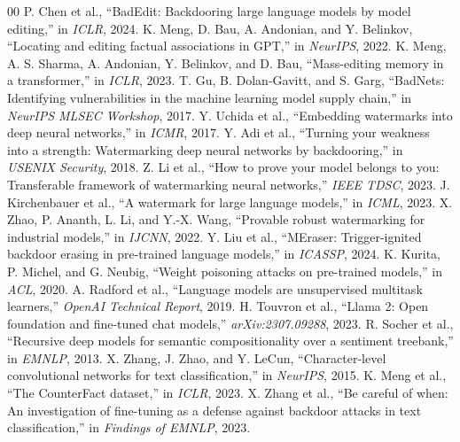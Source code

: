 \documentclass[conference,10pt]{IEEEtran}
\begin{document}
\begin{thebibliography}{00}
 P. Chen et al., ``BadEdit: Backdooring large language
models by model editing,'' in \emph{ICLR}, 2024.
 K. Meng, D. Bau, A. Andonian, and Y. Belinkov,
``Locating and editing factual associations in GPT,'' in \emph{NeurIPS}, 2022.
 K. Meng, A. S. Sharma, A. Andonian, Y. Belinkov, and
D. Bau, ``Mass-editing memory in a transformer,'' in \emph{ICLR}, 2023.
 T. Gu, B. Dolan-Gavitt, and S. Garg, ``BadNets:
Identifying vulnerabilities in the machine learning model supply chain,''
in \emph{NeurIPS MLSEC Workshop}, 2017.
 Y. Uchida et al., ``Embedding watermarks into deep neural
networks,'' in \emph{ICMR}, 2017.
 Y. Adi et al., ``Turning your weakness into a strength:
Watermarking deep neural networks by backdooring,'' in \emph{USENIX
Security}, 2018.
 Z. Li et al., ``How to prove your model belongs to you:
Transferable framework of watermarking neural networks,'' \emph{IEEE TDSC},
2023.
 J. Kirchenbauer et al., ``A watermark for large
language models,'' in \emph{ICML}, 2023.
 X. Zhao, P. Ananth, L. Li, and Y.-X. Wang, ``Provable robust
watermarking for industrial models,'' in \emph{IJCNN}, 2022.
 Y. Liu et al., ``MEraser: Trigger-ignited backdoor
erasing in pre-trained language models,'' in \emph{ICASSP}, 2024.
 K. Kurita, P. Michel, and G. Neubig, ``Weight poisoning
attacks on pre-trained models,'' in \emph{ACL}, 2020.
 A. Radford et al., ``Language models are unsupervised
multitask learners,'' \emph{OpenAI Technical Report}, 2019.
 H. Touvron et al., ``Llama 2: Open foundation and
fine-tuned chat models,'' \emph{arXiv:2307.09288}, 2023.
 R. Socher et al., ``Recursive deep models for semantic
compositionality over a sentiment treebank,'' in \emph{EMNLP}, 2013.
 X. Zhang, J. Zhao, and Y. LeCun, ``Character-level
convolutional networks for text classification,'' in \emph{NeurIPS}, 2015.
 K. Meng et al., ``The CounterFact dataset,''
in \emph{ICLR}, 2023.
 X. Zhang et al., ``Be careful of when: An investigation
of fine-tuning as a defense against backdoor attacks in text
classification,'' in \emph{Findings of EMNLP}, 2023.
\end{thebibliography}

\balance
\end{document}
